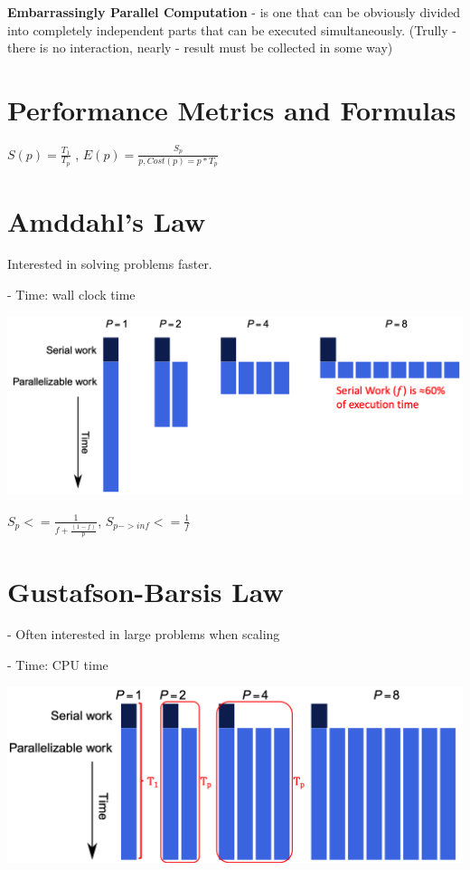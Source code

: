 \textbf{Embarrassingly Parallel Computation} - is one that can be obviously divided into completely independent parts that can be executed simultaneously. (Trully - there is no interaction, nearly - result must be collected in some way)

\section{Performance Metrics and Formulas}

$S(p) = \frac{T_1}{T_p}$ , $E(p) = \frac{S_p}{p , Cost(p) = p * T_p}$

\section{Amddahl's Law}

Interested in solving problems faster.\par

- Time: wall clock time

\includegraphics[width=\linewidth]{img/Amh.png}

$S_p <= \frac{1}{f + \frac{(1-f)}{p}}$, $S_{p->inf} <= \frac{1}{f}$ \par

\section{Gustafson-Barsis Law}

- Often interested in large problems when scaling\par
- Time: CPU time

\includegraphics[width=\linewidth]{img/gus.png}

